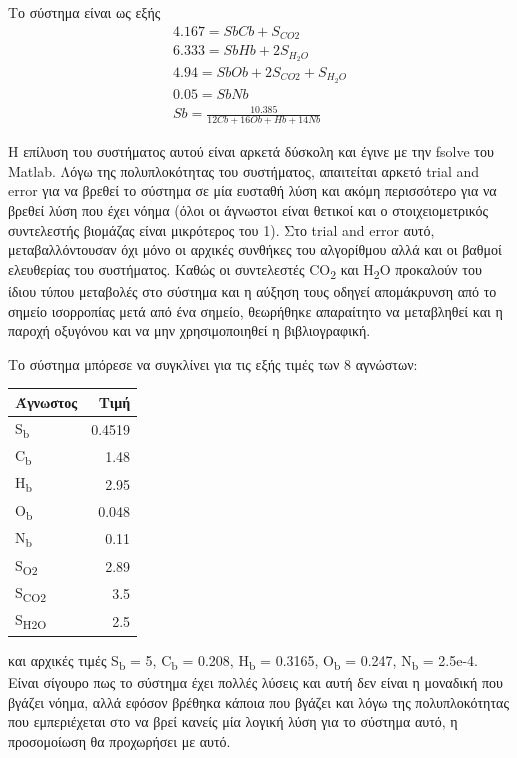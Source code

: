 \documentclass[11pt]{article}
\begin{document}
Το σύστημα είναι ως εξής
\begin{align*}
4.167 = SbCb + S_{CO2} \\ 6.333 = SbHb + 2S_{H_2O} \\ 4.94 = SbOb + 2S_{CO2} + S_{H_2O} \\ 0.05 = SbNb \\ Sb = \frac{10.385}{12Cb+16Ob+Hb+14Nb}
\end{align*} 

Η επίλυση του συστήματος αυτού είναι αρκετά δύσκολη και έγινε με την fsolve του Matlab. Λόγω της πολυπλοκότητας του συστήματος, απαιτείται αρκετό trial and error για να βρεθεί το σύστημα σε μία ευσταθή λύση και ακόμη περισσότερο για να βρεθεί λύση που έχει νόημα (όλοι οι άγνωστοι είναι θετικοί και ο στοιχειομετρικός συντελεστής βιομάζας είναι μικρότερος του 1). Στο trial and error αυτό, μεταβαλλόντουσαν όχι μόνο οι αρχικές συνθήκες του αλγορίθμου αλλά και οι βαθμοί ελευθερίας του συστήματος. Καθώς οι συντελεστές CO\textsubscript{2} και H\textsubscript{2}O προκαλούν του ίδιου τύπου μεταβολές στο σύστημα και η αύξηση τους οδηγεί απομάκρυνση από το σημείο ισορροπίας μετά από ένα σημείο, θεωρήθηκε απαραίτητο να μεταβληθεί και η παροχή οξυγόνου και να μην χρησιμοποιηθεί η βιβλιογραφική.

Το σύστημα μπόρεσε να συγκλίνει για τις εξής τιμές των 8 αγνώστων:
\begin{center}
\begin{tabular}{lr}
Άγνωστος & Τιμή\\
\hline
S\textsubscript{b} & 0.4519\\
C\textsubscript{b} & 1.48\\
H\textsubscript{b} & 2.95\\
O\textsubscript{b} & 0.048\\
N\textsubscript{b} & 0.11\\
S\textsubscript{O2} & 2.89\\
S\textsubscript{CO2} & 3.5\\
S\textsubscript{H2O} & 2.5\\
\end{tabular}
\end{center}
και αρχικές τιμές S\textsubscript{b} = 5, C\textsubscript{b} = 0.208, H\textsubscript{b} = 0.3165, O\textsubscript{b} = 0.247, N\textsubscript{b} = 2.5e-4. Είναι σίγουρο πως το σύστημα έχει πολλές λύσεις και αυτή δεν είναι η μοναδική που βγάζει νόημα, αλλά εφόσον βρέθηκα κάποια που βγάζει και λόγω της πολυπλοκότητας που εμπεριέχεται στο να βρεί κανείς μία λογική λύση για το σύστημα αυτό, η προσομοίωση θα προχωρήσει με αυτό.
\end{document}
